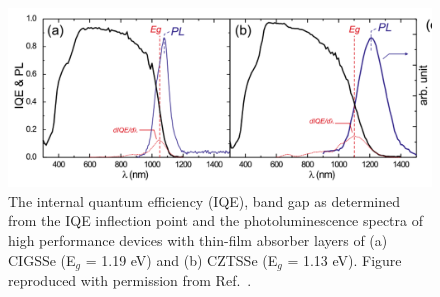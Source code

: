 \documentclass[11pt, twoside]{report}
\begin{document}
\begin{figure}[h!]
  \centering
    \includegraphics[width=1.0\textwidth]{figures/CZTS+CIGS_PL.png}
    \caption[The internal quantum efficiency (IQE), band gap as determined from the IQE inflection point and the photoluminescence spectra of high performance devices with thin-film absorber layers of (a) CIGSSe (E$_g$ = 1.19 eV) and (b) CZTSSe (E$_g$ = 1.13 eV).]{The internal quantum efficiency (IQE), band gap as determined from the IQE inflection point and the photoluminescence spectra of high performance devices with thin-film absorber layers of (a) CIGSSe (E$_g$ = 1.19 eV) and (b) CZTSSe (E$_g$ = 1.13 eV). Figure reproduced with permission from Ref.~.}
  \label{CZTS+CIGS_PL}
\end{figure}
\end{document}
